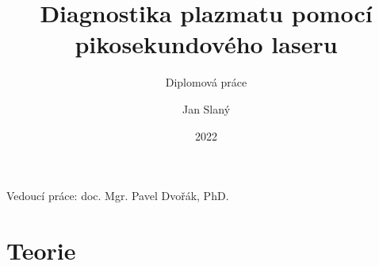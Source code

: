\documentclass{beamer}
\title[Laserová diagnostika plazmatu]
{Diagnostika plazmatu pomocí pikosekundového laseru}
\subtitle{Diplomová práce}
\date{2022}
\author{Jan Slaný}
\institute[PřF MUNI]{Přírodovědecká fakulta Masarykovy univerzity\\
	Ústav fyzikální elektroniky}
\begin{document}
\begin{frame}[plain]
	\titlepage
	\footnotesize
	Vedoucí práce: \hfill doc. Mgr. Pavel Dvořák, PhD.
\end{frame}

\section{Teorie}
\end{document}
